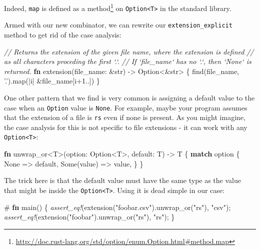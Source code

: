 \documentclass[a4paper,]{book}
\newenvironment{Shaded}{\begin{snugshade}}{\end{snugshade}}
\newcommand{\KeywordTok}[1]{\textcolor[rgb]{0.13,0.29,0.53}{\textbf{{#1}}}}
\newcommand{\DataTypeTok}[1]{\textcolor[rgb]{0.13,0.29,0.53}{{#1}}}
\newcommand{\DecValTok}[1]{\textcolor[rgb]{0.00,0.00,0.81}{{#1}}}
\newcommand{\ConstantTok}[1]{\textcolor[rgb]{0.00,0.00,0.00}{{#1}}}
\newcommand{\CharTok}[1]{\textcolor[rgb]{0.31,0.60,0.02}{{#1}}}
\newcommand{\StringTok}[1]{\textcolor[rgb]{0.31,0.60,0.02}{{#1}}}
\newcommand{\CommentTok}[1]{\textcolor[rgb]{0.56,0.35,0.01}{\textit{{#1}}}}
\newcommand{\PreprocessorTok}[1]{\textcolor[rgb]{0.56,0.35,0.01}{\textit{{#1}}}}
\newcommand{\NormalTok}[1]{{#1}}
\renewcommand{\href}[2]{#2\footnote{\url{#1}}}
\begin{document}
Indeed, \texttt{map} is
\href{http://doc.rust-lang.org/std/option/enum.Option.html\#method.map}{defined
as a method} on \texttt{Option\textless{}T\textgreater{}} in the
standard library.

Armed with our new combinator, we can rewrite our
\texttt{extension\_explicit} method to get rid of the case analysis:

\begin{Shaded}
\begin{Highlighting}[]
\CommentTok{// Returns the extension of the given file name, where the extension is defined}
\CommentTok{// as all characters proceding the first `.`.}
\CommentTok{// If `file_name` has no `.`, then `None` is returned.}
\KeywordTok{fn} \NormalTok{extension(file_name: &}\DataTypeTok{str}\NormalTok{) -> }\DataTypeTok{Option}\NormalTok{<&}\DataTypeTok{str}\NormalTok{> \{}
    \NormalTok{find(file_name, }\CharTok{'.'}\NormalTok{).map(|i| &file_name[i+}\DecValTok{1.}\NormalTok{.])}
\NormalTok{\}}
\end{Highlighting}
\end{Shaded}

One other pattern that we find is very common is assigning a default
value to the case when an \texttt{Option} value is \texttt{None}. For
example, maybe your program assumes that the extension of a file is
\texttt{rs} even if none is present. As you might imagine, the case
analysis for this is not specific to file extensions - it can work with
any \texttt{Option\textless{}T\textgreater{}}:

\begin{Shaded}
\begin{Highlighting}[]
\KeywordTok{fn} \NormalTok{unwrap_or<T>(option: }\DataTypeTok{Option}\NormalTok{<T>, default: T) -> T \{}
    \KeywordTok{match} \NormalTok{option \{}
        \ConstantTok{None} \NormalTok{=> default,}
        \ConstantTok{Some}\NormalTok{(value) => value,}
    \NormalTok{\}}
\NormalTok{\}}
\end{Highlighting}
\end{Shaded}

The trick here is that the default value must have the same type as the
value that might be inside the
\texttt{Option\textless{}T\textgreater{}}. Using it is dead simple in
our case:

\begin{Shaded}
\begin{Highlighting}[]
\NormalTok{#}
\KeywordTok{fn} \NormalTok{main() \{}
    \PreprocessorTok{assert_eq!}\NormalTok{(extension(}\StringTok{"foobar.csv"}\NormalTok{).unwrap_or(}\StringTok{"rs"}\NormalTok{), }\StringTok{"csv"}\NormalTok{);}
    \PreprocessorTok{assert_eq!}\NormalTok{(extension(}\StringTok{"foobar"}\NormalTok{).unwrap_or(}\StringTok{"rs"}\NormalTok{), }\StringTok{"rs"}\NormalTok{);}
\NormalTok{\}}
\end{Highlighting}
\end{Shaded}
\end{document}
